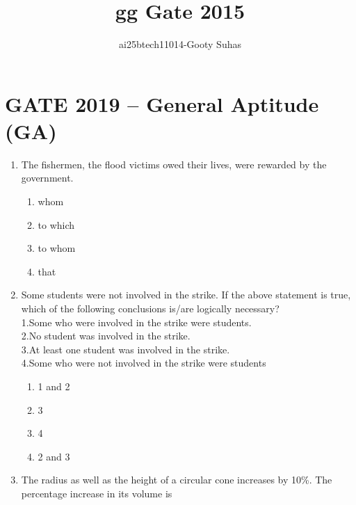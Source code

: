 \documentclass[journal,12pt,onecolumn]{IEEEtran}
\theoremstyle{remark}
\begin{document}
\title{gg Gate 2015}
\author{ai25btech11014-Gooty Suhas}
\maketitle



\section*{GATE 2019 -- General Aptitude (GA)}

\begin{enumerate}[resume]

\item The fishermen, the flood victims owed their lives, were rewarded by the government.

\begin{multicols}{4}
\begin{enumerate}
\item whom  
\item to which  
\item to whom  
\item that  
\end{enumerate}
\end{multicols}

\item Some students were not involved in the strike.  
If the above statement is true, which of the following conclusions is/are logically necessary?\\
1.\quad Some who were involved in the strike were students.\\
2.\quad No student was involved in the strike.\\
3.\quad At least one student was involved in the strike.\\
4.\quad Some who were not involved in the strike were students

\begin{multicols}{4}
\begin{enumerate}
\item 1 and 2  
\item 3  
\item 4  
\item 2 and 3  
\end{enumerate}
\end{multicols}

\item The radius as well as the height of a circular cone increases by 10\%. The percentage increase in its volume is


\end{enumerate}
\end{document}
